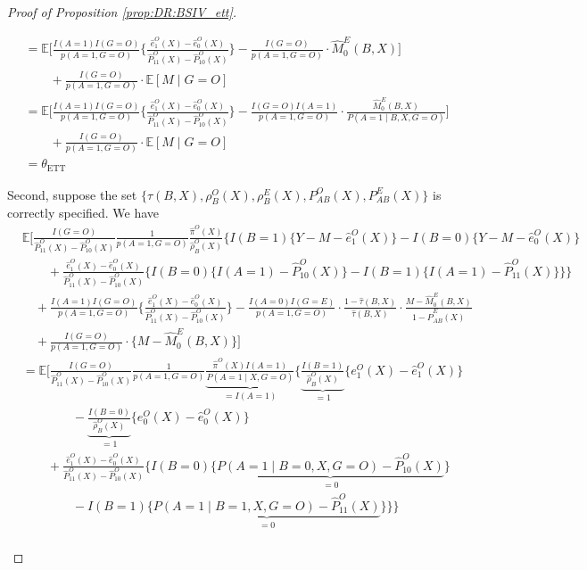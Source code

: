 \documentclass[10pt]{article}
\newcommand{\E}{\mathbb{E}}
\begin{document}
\begin{proof}[Proof of Proposition \ref{prop:DR:BSIV_ett}]
\begin{itemize}
{\begin{align*}
&=\E\Big[\frac{I(A=1)I(G=O)}{p(A=1,G=O)}\Big\{\frac{\hat{e}_1^O(X)-\hat{e}_0^O(X)}{\hat{P}_{11}^O(X)-\hat{P}_{10}^O(X)}\Big\}-\frac{I(G=O)}{p(A=1,G=O)}\cdot \hat{M}_{0}^{E}(B,X)\Big]\\
&\quad\quad+\frac{I(G=O)}{p(A=1,G=O)}\cdot \mathbb{E}[M\mid G=O]\\
&=\E\Big[\frac{I(A=1)I(G=O)}{p(A=1,G=O)}\Big\{\frac{\hat{e}_1^O(X)-\hat{e}_0^O(X)}{\hat{P}_{11}^O(X)-\hat{P}_{10}^O(X)}\Big\}-\frac{I(G=O)I(A=1)}{p(A=1,G=O)}\cdot\frac{\hat{M}_{0}^{E}(B,X)}{P(A=1\mid B,X,G=O)}\Big]\\
&\quad\quad+\frac{I(G=O)}{p(A=1,G=O)}\cdot \mathbb{E}[M\mid G=O]\\
&=\theta_{\text{ETT}}
\end{align*}}
\endgroup

Second, suppose the set $\{\tau(B,X),\rho_B^O(X),\rho_B^E(X),P_{AB}^O(X),P_{AB}^E(X)\}$ is correctly specified. We have
\begingroup
\allowdisplaybreaks
{\footnotesize \begin{align*}
&\E\Big[\frac{I(G=O)}{\hat{P}_{11}^O(X)-\hat{P}_{10}^O(X)}\frac{1}{p(A=1,G=O)}\frac{\hat{\pi}^O(X)}{\hat{\rho}_B^O(X)}\bigg\{I(B=1)\{Y-M-\hat{e}_1^O(X)\}-I(B=0)\{Y-M-\hat{e}_0^O(X)\}\\
&\quad\quad+\frac{\hat{e}_1^O(X)-\hat{e}_0^O(X)}{\hat{P}_{11}^O(X)-\hat{P}_{10}^O(X)}\big\{I(B=0)\{I(A=1)-\hat{P}_{10}^O(X)\}-I(B=1)\{I(A=1)-\hat{P}_{11}^O(X)\}\big\}\bigg\}\\
&\quad+\frac{I(A=1)I(G=O)}{p(A=1,G=O)}\Big\{\frac{\hat{e}_1^O(X)-\hat{e}_0^O(X)}{\hat{P}_{11}^O(X)-\hat{P}_{10}^O(X)}\Big\}-\frac{I(A=0)I(G=E)}{p(A=1,G=O)}\cdot\frac{1-\hat{\tau}(B,X)}{\hat{\tau}(B,X)}\cdot
\frac{M-\hat{M}_{0}^{E}(B,X)}{1-\hat{P}_{AB}^E(X)}\\
&\quad+\frac{I(G=O)}{p(A=1,G=O)}\cdot \{M-\hat{M}_{0}^{E}(B,X)\}\Big]\\
&=\E\Big[\frac{I(G=O)}{\hat{P}_{11}^O(X)-\hat{P}_{10}^O(X)}\frac{1}{p(A=1,G=O)}\underbrace{\frac{\hat{\pi}^O(X)I(A=1)}{P(A=1\mid X,G=O)}}_{=I(A=1)}\bigg\{\underbrace{\frac{I(B=1)}{\hat{\rho}_B^O(X)}}_{=1}\{e_1^O(X)-\hat{e}_1^O(X)\}\\
&\quad\quad\quad\quad-\underbrace{\frac{I(B=0)}{\hat{\rho}_B^O(X)}}_{=1}\{e_0^O(X)-\hat{e}_0^O(X)\}\\
&\quad\quad+\frac{\hat{e}_1^O(X)-\hat{e}_0^O(X)}{\hat{P}_{11}^O(X)-\hat{P}_{10}^O(X)}\big\{I(B=0)\{\underbrace{P(A=1\mid B=0,X,G=O)-\hat{P}_{10}^O(X)}_{=0}\}\\
&\quad\quad\quad\quad-I(B=1)\{\underbrace{P(A=1\mid B=1,X,G=O)-\hat{P}_{11}^O(X)}_{=0}\}\big\}\bigg\}\\

\end{align*}}
\end{itemize}
\end{proof}
\end{document}
